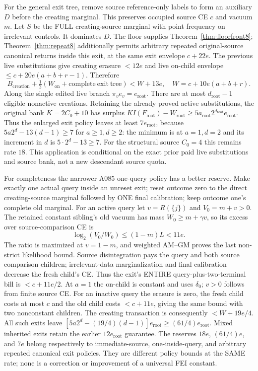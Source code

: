 \documentclass[11pt]{article}
\begin{document}
For the general exit tree, remove source reference-only labels to form
an auxiliary $D$ before the creating marginal. This preserves occupied
source CE $c$ and vacuum $m$. Let $S$ be the FULL creating-source
marginal with point frequency on irrelevant controls. It dominates
$D$. The floor supplies Theorem~\ref{thm:floorfront8};
Theorem~\ref{thm:repeat8} additionally permits arbitrary repeated
original-source canonical returns inside this exit, at the same
exit envelope $c+22e$.
The previous live substitutions give creating erasure $<12e$ and
live on-child envelope $\le c+20e(a+b+r-1)$. Therefore
\[
B_{\mathrm{creation}}+\tfrac12(W_{\mathrm{on}}+
 \mathrm{complete\ exit\ tree})<W+13e,
\quad W=c+10e(a+b+r).
\]
Along the single edited live branch $\pi_v e_v=e_{\mathrm{root}}$.
There are at most $d_{\mathrm{root}}-1$ eligible nonactive creations.
Retaining the already proved active substitutions, the original bank
$K=2C_0+10$ has surplus
$KI(F_{\mathrm{root}})-W_{\mathrm{root}}\ge
5a_{\mathrm{root}}2^{d_{\mathrm{root}}}e_{\mathrm{root}}$.
Thus the enlarged exit policy leaves at least $7e_{\mathrm{root}}$,
because $5a2^d-13(d-1)\ge7$ for $a\ge1,d\ge2$:
the minimum is at $a=1,d=2$ and its increment in $d$ is
$5\cdot2^d-13\ge7$.
For the structural source $C_0=4$ this remains rate $18$.
This application is conditional on the exact prior paid live
substitutions and source bank, not a new descendant source quota.

For completeness the narrower A085 one-query policy has a better
reserve. Make exactly one actual query inside an unreset exit;
reset outcome zero to the direct creating-source marginal followed
by ONE final calibration; keep outcome one's complete old marginal.
For an active query let $v=R(\{j\})$ and $V_0=m+v>0$.
The retained constant sibling's old vacuum has mass
$W_0\ge m+\gamma v$, so its excess over source-comparison CE is
\[
\log_2(V_0/W_0)\le(1-m)L<11e.
\]
The ratio is maximized at $v=1-m$, and weighted AM--GM proves the
last non-strict likelihood bound. Source disintegration pays the
query and both source comparison children; irrelevant-data
marginalization and final calibration decrease the fresh child's CE.
Thus the exit's ENTIRE query-plus-two-terminal bill is
$<c+11e/2$. At $a=1$ the on-child is constant and uses $\delta_0$;
$v>0$ follows from finite source CE. For an inactive query the
erasure is zero, the fresh child costs at most $c$ and the old child
costs $<c+11e$, giving the same bound with two nonconstant children.
The creating transaction is consequently $<W+19e/4$.
All such exits leave $[5a2^d-(19/4)(d-1)]e_{\mathrm{root}}
\ge(61/4)e_{\mathrm{root}}$. Mixed inherited exits retain the earlier
$12e_{\mathrm{root}}$ guarantee.
The reserves $18e$, $(61/4)e$, and $7e$ belong respectively to
immediate-source, one-inside-query, and arbitrary repeated canonical
exit policies. They are different policy bounds at the SAME rate;
none is a correction or improvement of a universal FEI constant.
\end{document}
